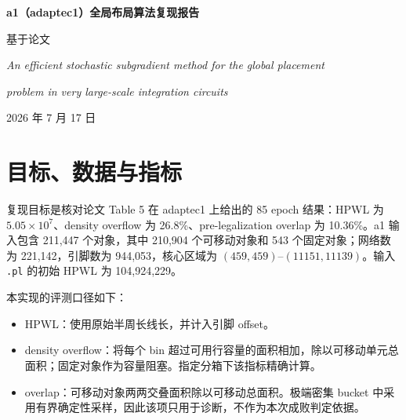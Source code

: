 \documentclass[11pt,a4paper]{ctexart}
\newcommand{\RBSM}{\textsc{RBSM}}
\newcommand{\HPWL}{\textsc{HPWL}}
\begin{document}
\pagestyle{plain}
\begin{center}
{\LARGE\bfseries a1（adaptec1）全局布局算法复现报告\par}
\vspace{0.7em}
{\small 基于论文\par}
{\small\itshape An efficient stochastic subgradient method for the global placement\par}
{\small\itshape problem in very large-scale integration circuits\par}
\vspace{0.4em}
{\small 2026 年 7 月 17 日\par}
\end{center}
\vspace{0.6em}

\begin{abstract}
本报告记录了对论文所述随机批量次梯度（\RBSM）全局布局算法的独立实现、在 a1/adaptec1 场景上的复现实验、主要调参过程及失败归因。实现可以稳定完成 Bookshelf 解析、GPU 优化与 \texttt{.pl} 布局输出，并能把 \HPWL{} 优化到论文同一量级；但在三次完整的密度优先实验中，density overflow 稳定在约 53.17\%，显著高于论文 Table 5 的 26.8\%。因此，本次工作复现了算法流程及其可运行实现，但\textbf{没有复现论文在 a1 上的三项联合指标}。
\end{abstract}

\section{目标、数据与指标}

复现目标是核对论文 Table 5 在 adaptec1 上给出的 85 epoch 结果：\HPWL{} 为 $5.05\times 10^7$、density overflow 为 26.8\%、pre-legalization overlap 为 10.36\%。a1 输入包含 211,447 个对象，其中 210,904 个可移动对象和 543 个固定对象；网络数为 221,142，引脚数为 944,053，核心区域为 $(459,459)$--$(11151,11139)$。输入 \texttt{.pl} 的初始 \HPWL{} 为 104,924,229。

本实现的评测口径如下：
\begin{itemize}
  \item \HPWL{}：使用原始半周长线长，并计入引脚 offset。
  \item density overflow：将每个 bin 超过可用行容量的面积相加，除以可移动单元总面积；固定对象作为容量阻塞。指定分箱下该指标精确计算。
  \item overlap：可移动对象两两交叠面积除以可移动总面积。极端密集 bucket 中采用有界确定性采样，因此该项只用于诊断，不作为本次成败判定依据。
\end{itemize}
\end{document}
